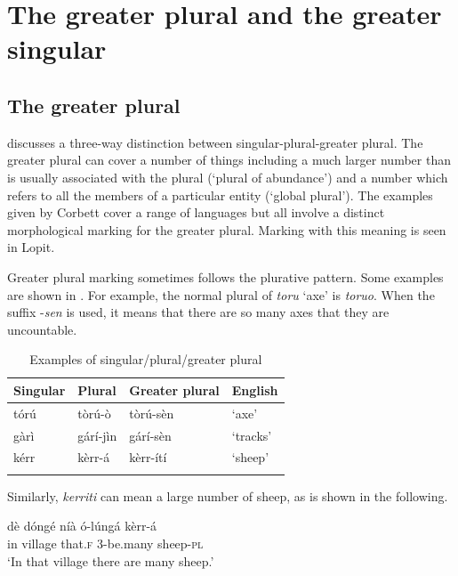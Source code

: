 \documentclass[output=paper]{langsci/langscibook}
\begin{document}
\section{The greater plural and the greater singular} \label{sec:moodie:5}


\subsection{The greater plural} \label{sec:moodie:5.1}

\citet[30]{Corbett2000} discusses a three-way distinction between singular-plural-greater plural. The greater plural can cover a number of things including a much larger number than is usually associated with the plural (‘plural of abundance’) and a number which refers to all the members of a particular entity (‘global plural’). The examples given by Corbett cover a range of languages but all involve a distinct morphological marking for the greater plural. Marking with this meaning is seen in Lopit. 

Greater plural marking sometimes follows the plurative pattern. Some examples are shown in . For example, the normal plural of \textit{toru} ‘axe’ is \textit{toruo}. When the suffix -\textit{sen }is used, it means that there are so many axes that they are uncountable.

\begin{table}
\begin{tabularx}{\textwidth}{XXXX}
\lsptoprule

 \textbf{Singular} & \textbf{Plural} & \textbf{Greater plural} & \textbf{English}\\ \midrule
 t\'{o}r\'{u} &  t\`{o}r\'{u}-\`{o} &  t\`{o}r\'{u}-s\`{e}n & \mdseries ‘axe’\\
 g\`{a}r\`{i} &  g\'{a}r\'{i}-j\`{i}n &  g\'{a}r\'{i}-s\`{e}n & \mdseries ‘tracks’\\
 k\'{e}rr &  k\`{e}rr-\'{a} &  k\`{e}rr-\'{i}t\'{i} & \mdseries ‘sheep’\\
\lspbottomrule
\end{tabularx}
\caption{Examples of singular/plural/greater plural}
\label{tab:moodie:17}
\end{table}

Similarly, \textit{kerriti} can mean a large number of sheep, as is shown in the following.

\ea\label{ex:moodie:6}
\gll d\`{e} d\'{o}ng\'{e} n\'{i}\`{a} \'{o}-l\'{u}ng\'{a} k\`{e}rr-\'{a} \\
in village that.\textsc{f} 3-be.many sheep-\textsc{pl} \\
\glt ‘In that village there are many sheep.’
\z
\end{document}
